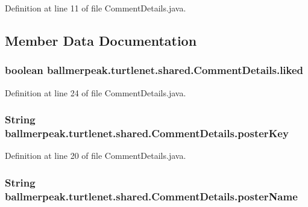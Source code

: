 Definition at line 11 of file Comment\-Details.\-java.



\subsection{Member Data Documentation}
\hypertarget{classballmerpeak_1_1turtlenet_1_1shared_1_1CommentDetails_a7aa48bc7182ff337eba405d2d7bb053f}{
\subsubsection[{liked}]{\setlength{\rightskip}{0pt plus 5cm}boolean ballmerpeak.\-turtlenet.\-shared.\-Comment\-Details.\-liked}}\label{classballmerpeak_1_1turtlenet_1_1shared_1_1CommentDetails_a7aa48bc7182ff337eba405d2d7bb053f}


Definition at line 24 of file Comment\-Details.\-java.

\hypertarget{classballmerpeak_1_1turtlenet_1_1shared_1_1CommentDetails_a018d0738dd22703504c33b3bb6f8871a}{
\subsubsection[{poster\-Key}]{\setlength{\rightskip}{0pt plus 5cm}String ballmerpeak.\-turtlenet.\-shared.\-Comment\-Details.\-poster\-Key}}\label{classballmerpeak_1_1turtlenet_1_1shared_1_1CommentDetails_a018d0738dd22703504c33b3bb6f8871a}


Definition at line 20 of file Comment\-Details.\-java.

\hypertarget{classballmerpeak_1_1turtlenet_1_1shared_1_1CommentDetails_a0feb9ab9c020b33ca5053ae2d6992b44}{
\subsubsection[{poster\-Name}]{\setlength{\rightskip}{0pt plus 5cm}String ballmerpeak.\-turtlenet.\-shared.\-Comment\-Details.\-poster\-Name}}\label{classballmerpeak_1_1turtlenet_1_1shared_1_1CommentDetails_a0feb9ab9c020b33ca5053ae2d6992b44}


